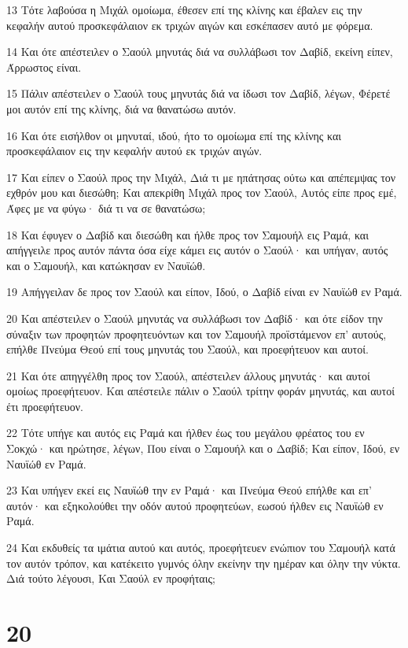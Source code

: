 \par 13 Τότε λαβούσα η Μιχάλ ομοίωμα, έθεσεν επί της κλίνης και έβαλεν εις την κεφαλήν αυτού προσκεφάλαιον εκ τριχών αιγών και εσκέπασεν αυτό με φόρεμα.
\par 14 Και ότε απέστειλεν ο Σαούλ μηνυτάς διά να συλλάβωσι τον Δαβίδ, εκείνη είπεν, Άρρωστος είναι.
\par 15 Πάλιν απέστειλεν ο Σαούλ τους μηνυτάς διά να ίδωσι τον Δαβίδ, λέγων, Φέρετέ μοι αυτόν επί της κλίνης, διά να θανατώσω αυτόν.
\par 16 Και ότε εισήλθον οι μηνυταί, ιδού, ήτο το ομοίωμα επί της κλίνης και προσκεφάλαιον εις την κεφαλήν αυτού εκ τριχών αιγών.
\par 17 Και είπεν ο Σαούλ προς την Μιχάλ, Διά τι με ηπάτησας ούτω και απέπεμψας τον εχθρόν μου και διεσώθη; Και απεκρίθη Μιχάλ προς τον Σαούλ, Αυτός είπε προς εμέ, Άφες με να φύγω· διά τι να σε θανατώσω;
\par 18 Και έφυγεν ο Δαβίδ και διεσώθη και ήλθε προς τον Σαμουήλ εις Ραμά, και απήγγειλε προς αυτόν πάντα όσα είχε κάμει εις αυτόν ο Σαούλ· και υπήγαν, αυτός και ο Σαμουήλ, και κατώκησαν εν Ναυϊώθ.
\par 19 Απήγγειλαν δε προς τον Σαούλ και είπον, Ιδού, ο Δαβίδ είναι εν Ναυϊώθ εν Ραμά.
\par 20 Και απέστειλεν ο Σαούλ μηνυτάς να συλλάβωσι τον Δαβίδ· και ότε είδον την σύναξιν των προφητών προφητευόντων και τον Σαμουήλ προϊστάμενον επ' αυτούς, επήλθε Πνεύμα Θεού επί τους μηνυτάς του Σαούλ, και προεφήτευον και αυτοί.
\par 21 Και ότε απηγγέλθη προς τον Σαούλ, απέστειλεν άλλους μηνυτάς· και αυτοί ομοίως προεφήτευον. Και απέστειλε πάλιν ο Σαούλ τρίτην φοράν μηνυτάς, και αυτοί έτι προεφήτευον.
\par 22 Τότε υπήγε και αυτός εις Ραμά και ήλθεν έως του μεγάλου φρέατος του εν Σοκχώ· και ηρώτησε, λέγων, Που είναι ο Σαμουήλ και ο Δαβίδ; Και είπον, Ιδού, εν Ναυϊώθ εν Ραμά.
\par 23 Και υπήγεν εκεί εις Ναυϊώθ την εν Ραμά· και Πνεύμα Θεού επήλθε και επ' αυτόν· και εξηκολούθει την οδόν αυτού προφητεύων, εωσού ήλθεν εις Ναυϊώθ εν Ραμά.
\par 24 Και εκδυθείς τα ιμάτια αυτού και αυτός, προεφήτευεν ενώπιον του Σαμουήλ κατά τον αυτόν τρόπον, και κατέκειτο γυμνός όλην εκείνην την ημέραν και όλην την νύκτα. Διά τούτο λέγουσι, Και Σαούλ εν προφήταις;

\chapter{20}

